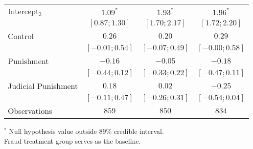 \begin{table}[h]
\begin{center}
\begin{threeparttable}
\begin{tabular}{l c c c}
Intercept$_3$       & $1.09^{*}$        & $1.93^{*}$        & $1.96^{*}$        \\
                    & $ [ 0.87;  1.30]$ & $ [ 1.70;  2.17]$ & $ [ 1.72;  2.20]$ \\
Control             & $0.26$            & $0.20$            & $0.29$            \\
                    & $ [-0.01;  0.54]$ & $ [-0.07;  0.49]$ & $ [-0.00;  0.58]$ \\
Punishment          & $-0.16$           & $-0.05$           & $-0.18$           \\
                    & $ [-0.44;  0.12]$ & $ [-0.33;  0.22]$ & $ [-0.47;  0.11]$ \\
Judicial Punishment & $0.18$            & $0.02$            & $-0.25$           \\
                    & $ [-0.11;  0.47]$ & $ [-0.26;  0.31]$ & $ [-0.54;  0.04]$ \\
\hline
Observations        & $859$             & $850$             & $834$             \\
\hline
\end{tabular}
\begin{tablenotes}[flushleft]
\scriptsize{$^*$ Null hypothesis value outside 89\% credible interval.  \\
Fraud treatment group serves as the baseline.}
\end{tablenotes}
\end{threeparttable}
\label{table:coefficients}
\end{center}
\end{table}
